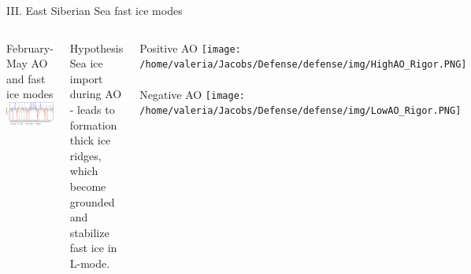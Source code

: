 \documentclass[8pt]{beamer}
\begin{document}
\setwatermark{\fontsize{125pt}{125pt}\selectfont{}}
\begin{frame}[fragile]{III. East Siberian Sea fast ice modes}
\begin{center}
\begin{columns}
	\centering
	February-May AO and fast ice modes
	\includegraphics[width=1\textwidth]{./img/AO.pdf}\\~\\
	\begin{block}{Hypothesis}
		Sea ice import during AO - leads to formation thick ice ridges, which become grounded and stabilize fast ice in L-mode.
	\end{block}
	Positive AO
	\texttt{[image: /home/valeria/Jacobs/Defense/defense/img/HighAO\_Rigor.PNG]}\\~\\
	Negative AO
	\texttt{[image: /home/valeria/Jacobs/Defense/defense/img/LowAO\_Rigor.PNG]}
\end{columns}	


\end{center}
\end{frame}
\end{document}
